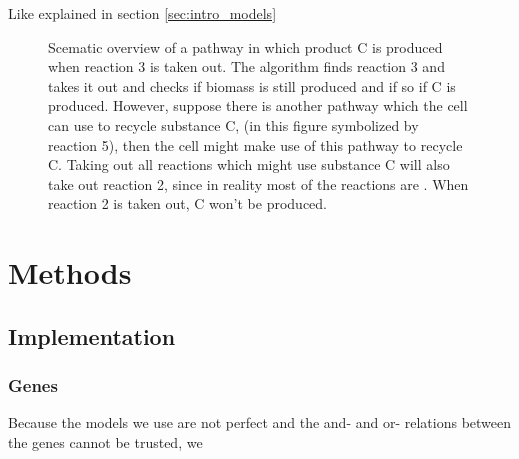 \documentclass[10pt]{report}
\begin{document}
Like explained in section \ref{sec:intro_models}

\begin{figure}[hbtp]
  \centering
     
      \caption{Scematic overview of a pathway in which product C is produced when reaction 3 is taken out. The algorithm finds reaction 3 and takes it out and checks if biomass is still produced and if so if C is produced. However, suppose there is another pathway which the cell can use to recycle substance C, (in this figure symbolized by reaction 5), then the cell might make use of this pathway to recycle C. Taking out all reactions which might use substance C will also take out reaction 2, since in reality most of the reactions are . When reaction 2 is taken out, C won't be produced.}
  \label{fig:reaction-overview}
\end{figure}



\section{Methods}
\subsection{Implementation}
\subsubsection{Genes}
Because the models we use are not perfect and the and- and or- relations between the genes cannot be trusted, we 
\end{document}
